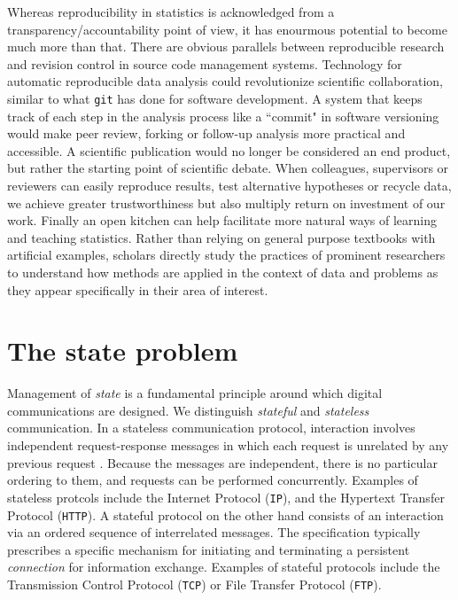 \documentclass{article}
\newcommand{\HTTP}{\texttt{HTTP}\xspace}
\newcommand{\TCP}{\texttt{TCP}\xspace}
\newcommand{\IP}{\texttt{IP}\xspace}
\begin{document}
Whereas reproducibility in statistics is acknowledged from a transparency/accountability point of view, it has enourmous potential to become much more than that. There are obvious parallels between reproducible research and revision control in source code management systems. Technology for automatic reproducible data analysis could revolutionize scientific collaboration, similar to what \texttt{git} has done for software development. A system that keeps track of each step in the  analysis process like a ``commit" in software versioning would make peer review, forking or follow-up analysis more practical and accessible. A scientific publication would no longer be considered an end product, but rather the starting point of scientific debate. When colleagues, supervisors or reviewers can easily reproduce results, test alternative hypotheses or recycle data, we achieve greater trustworthiness but also multiply return on investment of our work. Finally an open kitchen can help facilitate more natural ways of learning and teaching statistics. Rather than relying on general purpose textbooks with artificial examples, scholars directly study the practices of prominent researchers to understand how methods are applied in the context of data and problems as they appear specifically in their area of interest.


\section{The state problem}

Management of \emph{state} is a fundamental principle around which digital communications are designed. We distinguish \emph{stateful} and \emph{stateless} communication. In a stateless communication protocol, interaction involves independent request-response messages in which each request is unrelated by any previous request \citep{hennessy2012computer}. Because the messages are independent, there is no particular ordering to them, and requests can be performed concurrently. Examples of stateless protcols include the Internet Protocol (\IP), and the Hypertext Transfer Protocol (\HTTP). A stateful protocol on the other hand consists of an interaction via an ordered sequence of interrelated messages. The specification typically prescribes a specific mechanism for initiating and terminating a persistent \emph{connection} for information exchange. Examples of stateful protocols include the Transmission Control Protocol (\TCP) or File Transfer Protocol (\texttt{FTP}).
\end{document}
